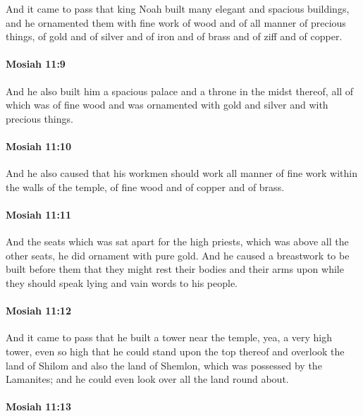 			And it came to pass that
			king Noah built many elegant and spacious buildings,
			and he ornamented them with fine work of wood
			and of all manner of precious things,
			of gold and of silver and of iron and of brass and of ziff and of copper.

		\paragraph{Mosiah 11:9} %
			\label{MOSIAH-11-9}

			And he also built him a spacious palace and a throne in the midst thereof,
			all of which was of fine wood
			and was ornamented with gold and silver and with precious things.

		\paragraph{Mosiah 11:10} %
			\label{MOSIAH-11-10}

			And he also caused that his workmen should work
			all manner of fine work within the walls of the temple,
			of fine wood and of copper and of brass.

		\paragraph{Mosiah 11:11} %
			\label{MOSIAH-11-11}

			And the seats which was sat apart for the high priests,
			which was above all the other seats,
			he did ornament with pure gold.
			And he caused a breastwork to be built before them
			that they might rest their bodies and their arms upon
			while they should speak lying and vain words to his people.

		\paragraph{Mosiah 11:12} %
			\label{MOSIAH-11-12}

			And it came to pass that he built a tower near the temple,
			yea, a very high tower,
			even so high that he could stand upon the top thereof
			and overlook the land of Shilom
			and also the land of Shemlon, which was possessed by the Lamanites;
			and he could even look over all the land round about.

		\paragraph{Mosiah 11:13} %
			\label{MOSIAH-11-13}

